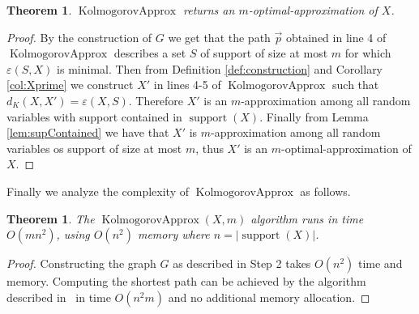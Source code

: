 \documentclass{article}
\newtheorem{theorem}[thm]{Theorem}
\DeclareMathOperator{\support}{support}
\DeclareMathOperator{\KlmApprox}{KolmogorovApprox}
\begin{document}
	\begin{theorem}\label{the:algo}
		$\KlmApprox$ returns an $m$-optimal-approximation of $X$.
	\end{theorem}
	\begin{proof}
		By the construction of $G$ we get that the path $\vec{p}$ obtained in line 4 of  $\KlmApprox$ describes a set $S$ of support of size at most $m$ for which $\varepsilon(S,X)$ is minimal. Then from Definition \ref{def:construction} and Corollary \ref{col:Xprime} we construct $X'$ in lines 4-5 of 	$\KlmApprox$ such that $d_K(X,X') = \varepsilon(X,S)$. Therefore $X'$ is an $m$-approximation among all random variables with support contained in $\support(X)$. Finally from Lemma \ref{lem:supContained} we have that $X'$ is  $m$-approximation among all random variables os support of size at most $m$, thus  $X'$ is an $m$-optimal-approximation of $X$.
	\end{proof}
	
	
	
	Finally we analyze the complexity of $\KlmApprox$ as follows.
	
	
	\begin{theorem}\label{the:complexity}
		The $\KlmApprox(X,m)$ algorithm runs in time $O(mn^2)$, using $O(n^2)$ memory where $n=|\support(X)|$.
	\end{theorem}
	\begin{proof}
		Constructing the graph $G$ as described in Step 2 takes $O(n^2)$ time and memory. Computing the shortest path can be achieved by the algorithm described in~\cite{guerin2002computing} in time $O(n^2 m)$ and no additional memory allocation.
	\end{proof}
	
	
\end{document}

